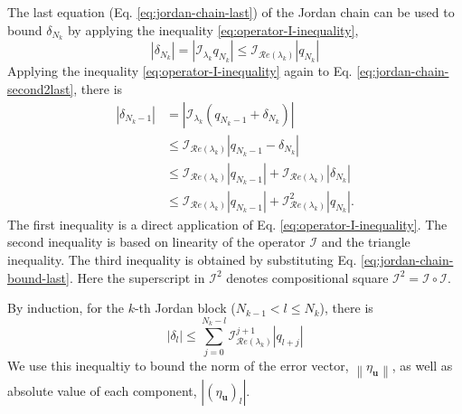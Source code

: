\documentclass[accepted]{uai2023}
\newcommand{\vect}[1]{\mathbf{#1}}
\newcommand{\Err}{\eta}
\newcommand{\I}{\mathcal{I}}
\renewcommand{\Re}[1]{\mathcal{R}e\left(#1\right)}
\begin{document}
    The last equation (Eq. \ref{eq:jordan-chain-last}) of the Jordan chain can be used to bound $\delta_{N_k}$ by applying the inequality \ref{eq:operator-I-inequality}, 
    \begin{equation}\label{eq:jordan-chain-bound-last}
        |\delta_{N_k}| = \left|\I_{\lambda_k}q_{N_k}\right| \leq \I_{\Re{\lambda_k}} |q_{N_k}|
    \end{equation}
    Applying the inequality \ref{eq:operator-I-inequality} again to Eq. \ref{eq:jordan-chain-second2last}, there is
    \begin{align}
        |\delta_{N_k-1}| &= \left|\I_{\lambda_k}\left(q_{N_k - 1} + \delta_{N_k}\right)\right| \\
        &\leq \I_{\Re{\lambda_k}} |q_{N_k - 1} - \delta_{N_k}| \\
        &\leq \I_{\Re{\lambda_k}} |q_{N_k - 1}| + \I_{\Re{\lambda_k}} |\delta_{N_k}| \\
        &\leq \I_{\Re{\lambda_k}} |q_{N_k - 1}| + \I_{\Re{\lambda_k}}^2 |q_{N_k}|.
    \end{align}
    The first inequality is a direct application of Eq. \ref{eq:operator-I-inequality}. 
    The second inequality is based on linearity of the operator $\I$ and the triangle inequality. 
    The third inequality is obtained by substituting Eq. \ref{eq:jordan-chain-bound-last}.
    Here the superscript in $\I^2$ denotes compositional square $\I^2 = \I\circ\I$.

    By induction, for the $k$-th Jordan block ($N_{k-1} < l \leq N_k$), there is
    \begin{equation}\label{eq:system-scalar-inequality-transformed}
        |\delta_{l}|  \leq \sum_{j=0}^{N_k - l} \I_{\Re{\lambda_k}} ^ {j+1} |q_{l+j}|
    \end{equation}
    We use this inequaltiy to bound the norm of the error vector, $\left\|\Err_\vect{u}\right\|$, as well as absolute value of each component, $\left|\left(\Err_{\vect{u}}\right)_l\right|$. 
\end{document}

